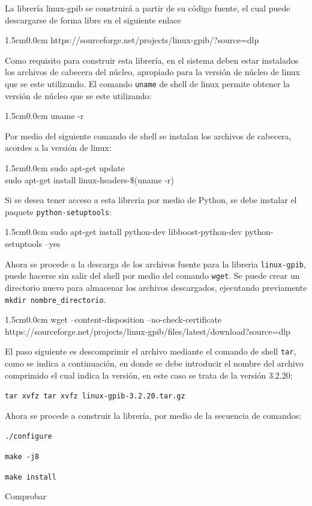 \documentclass[paper=letter,oneside,fontsize=11pt]{article}
\newcommand{\code}[1]{
	\begin{adjustwidth}{1.5cm}{0.0cm}
		\ttfamily
		#1
\end{adjustwidth}}
\begin{document}
		La librería linux-gpib se construirá a partir de su código fuente, el cual puede descargarse de forma libre en el siguiente enlace
		
			
		\code{https://sourceforge.net/projects/linux-gpib/?source=dlp}

		
		Como requisito para construir esta librería, en el sistema deben estar instalados los archivos de cabecera del núcleo, apropiado para la versión de núcleo de linux que se este utilizando. El comando \texttt{uname} de shell de linux permite obtener la versión de núcleo que se este utilizando:
		
		\code{uname -r}
		
		Por medio del siguiente comando de shell se instalan los archivos de cabecera, acordes a la versión de linux:
		
		\code{sudo apt-get update \\		
		sudo apt-get install linux-headers-\$(uname -r)}
		
		Si se desea tener acceso a esta librería por medio de Python, se debe instalar el paquete \texttt{python-setuptools}: 
		
		\code{sudo apt-get install python-dev libboost-python-dev python-setuptools --yes}
		
		Ahora se procede a la descarga de los archivos fuente para la libreria \texttt{linux-gpib}, puede hacerse sin salir del shell por medio del comando \texttt{wget}. Se puede crear un directorio nuevo para almacenar los archivos descargados, ejecutando previamente \texttt{mkdir nombre\_directorio}.
		
		\code{wget --content-disposition --no-check-certificate \\
			\indent https://sourceforge.net/projects/linux-gpib/files/latest/download?source=dlp}
		
		El paso siguiente es descomprimir el archivo mediante el comando de shell \texttt{tar}, como se indica a continuación, en donde se debe introducir el nombre del archivo comprimido el cual indica la versión, en este caso se trata de la versión 3.2.20:
		
		\texttt{tar xvfz tar xvfz linux-gpib-3.2.20.tar.gz}
		
		Ahora se procede a construir la librería, por medio de la secuencia de comandos:
		
		\texttt{./configure}
		
		\texttt{make -j8} 
		
		\texttt{make install}
		
		Comprobar
		
\end{document}

